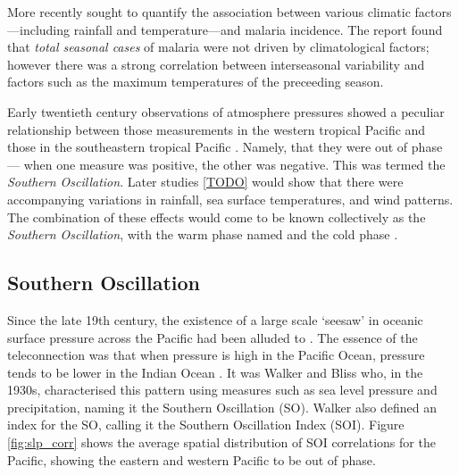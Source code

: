 More recently \cite{craig2004} sought to quantify the association between
various climatic factors---including rainfall and temperature---and malaria
incidence. The report found that \emph{total seasonal cases} of malaria were not
driven by climatological factors; however there was a strong correlation between
interseasonal variability and factors such as the maximum temperatures of the
preceeding season.




\vspace{1cm}

Early twentieth century observations of atmosphere pressures showed a peculiar
relationship between those measurements in the western tropical Pacific and
those in the southeastern tropical Pacific \citep{holton1989}. Namely, that they
were out of phase --- when one measure was positive, the other was negative.
This was termed the \emph{Southern Oscillation}. Later studies \ref{TODO} would
show that there were accompanying variations in rainfall, sea surface
temperatures, and wind patterns. The combination of these effects would come to
be known collectively as the \elnino{} \emph{Southern Oscillation}, with the
warm phase named \elnino{} and the cold phase \nina{}.


\subsection{Southern Oscillation}
Since the late 19th century, the existence of a large scale `seesaw' in oceanic
surface pressure across the Pacific had been alluded to
\citep{trenberth2000}. The essence of the teleconnection was that when pressure
is high in the Pacific Ocean, pressure tends to be lower in the Indian Ocean
\citep{philander1990}. It was Walker and Bliss who, in the 1930s, characterised
this pattern using measures such as sea level pressure and precipitation, naming
it the Southern Oscillation (SO). Walker also defined an index for the SO,
calling it the Southern Oscillation Index (SOI). Figure \ref{fig:slp_corr} shows
the average spatial distribution of SOI correlations for the Pacific, showing the eastern and western Pacific to be out of phase.

